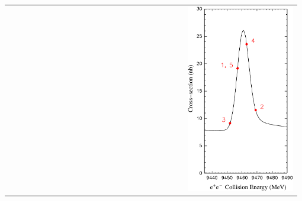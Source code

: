 \documentclass[landscape]{article}
\begin{document}
\begin{slide:energy}
\begin{tabular}{p{0.6\linewidth} p{0.38\linewidth}}
\begin{minipage}{\linewidth}
  \end{minipage} &
  \begin{minipage}{\linewidth}
    \includegraphics[width=\linewidth]{plots/fitorder}
  \end{minipage}
\end{tabular}

\end{slide:energy}
\end{document}
